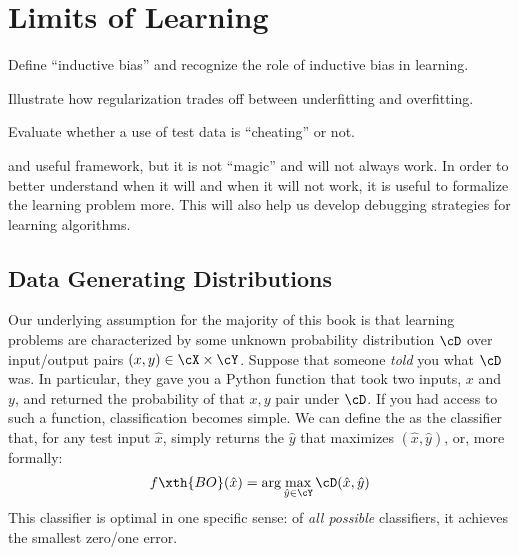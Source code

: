 \chapter{Limits of Learning} \label{sec:formal}




\begin{learningobjectives}
\item Define ``inductive bias'' and recognize the role of inductive
  bias in learning.
\item Illustrate how regularization trades off between underfitting
  and overfitting.
\item Evaluate whether a use of test data is ``cheating'' or not.
\end{learningobjectives}


 and useful framework, but it is not ``magic'' and will not always work.
In order to better understand when it will and when it will not work, it is useful to formalize the learning problem more.
This will also help us develop debugging strategies for learning algorithms.

\section{Data Generating Distributions}

Our underlying assumption for the majority of this book is that
learning problems are characterized by some unknown probability
distribution $\cD$ over input/output pairs $(x,y) \in \cX \times \cY$.
Suppose that someone \emph{told} you what $\cD$ was.  In particular,
they gave you a Python function  that took two inputs,
$x$ and $y$, and returned the probability of that $x,y$ pair under
$\cD$.  If you had access to such a function, classification becomes
simple.  We can define the  as the
classifier that, for any test input $\hat x$, simply returns the $\hat
y$ that maximizes $(\hat x, \hat y)$, or, more formally:
%
\begin{equation} \label{eq:prob:bayesopt}
  f\xth{BO}(\hat x) = \arg\max_{\hat y \in \cY} \cD(\hat x, \hat y)
\end{equation}
%
This classifier is optimal in one specific sense: of \emph{all
  possible} classifiers, it achieves the smallest zero/one error.

